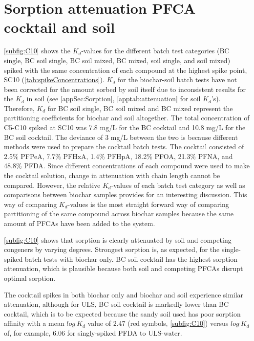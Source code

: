 
\section{Sorption attenuation PFCA cocktail and soil}
\cref{subfig:C10} shows the $K_d$-values for the different batch test categories (BC single, BC soil single, BC soil mixed, BC mixed, soil single, and soil mixed) spiked with the same concentration of each compound at the highest spike point, SC10 (\cref{tab:spikeConcentrations}). $K_d$ for the biochar-soil batch tests have not been corrected for the amount sorbed by soil itself due to inconsistent results for the $K_d$ in soil (see \cref{appSec:Sorption}, \cref{apptab:attenuation} for soil $K_d$'s). Therefore, $K_d$ for BC soil single, BC soil mixed and BC mixed represent the partitioning coefficients for biochar and soil altogether. The total concentration of C5-C10 spiked at SC10 was 7.8 mg/L for the BC cocktail and 10.8 mg/L for the BC soil cocktail. The deviance of 3 mg/L between the two is because different methods were used to prepare the cocktail batch tests. The cocktail consisted of 2.5\% PFPeA, 7.7\% PFHxA, 1.4\% PFHpA, 18.2\% PFOA, 21.3\% PFNA, and 48.8\% PFDA. Since different concentrations of each compound were used to make the cocktail solution, change in attenuation with chain length cannot be compared. However, the relative $K_d$-values of each batch test category as well as comparisons between biochar samples provides for an interesting discussion. This way of comparing $K_d$-values is the most straight forward way of comparing partitioning of the same compound across biochar samples because the same amount of PFCAs have been added to the system.

\cref{subfig:C10} shows that sorption is clearly attenuated by soil and competing congeners by varying degrees. Strongest sorption is, as expected, for the single-spiked batch tests with biochar only. BC soil cocktail has the highest sorption attenuation, which is plausible because both soil and competing PFCAs disrupt optimal sorption. 

The cocktail spikes in both biochar only and biochar and soil experience similar attenuation, although for ULS, BC soil cocktail is markedly lower than  BC cocktail, which is to be expected because the sandy soil used has poor sorption affinity with a mean $log~K_d$ value of 2.47 (red symbols, \cref{subfig:C10}) versus $log~K_d$ of, for example, 6.06 for singly-spiked PFDA to ULS-water.

